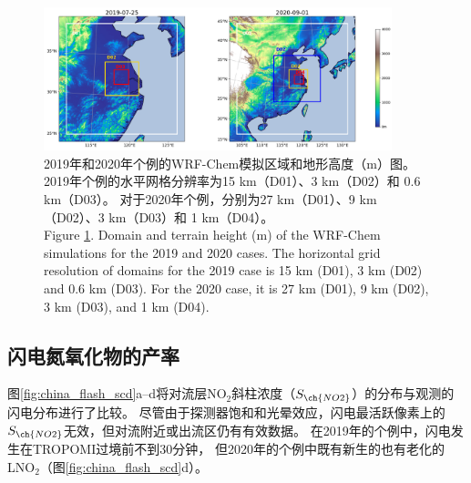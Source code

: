 \begin{figure}[!htbp]
\centering
\includegraphics[width=0.9\textwidth]{./figures/domains_china.png}
\caption{2019年和2020年个例的WRF-Chem模拟区域和地形高度（m）图。
2019年个例的水平网格分辨率为15 km（D01）、3 km（D02）和 0.6 km（D03）。
对于2020年个例，分别为27 km（D01）、9 km（D02）、3 km（D03）和 1 km（D04）。\\
Figure \ref{fig:domains_china}. Domain and terrain height (m) of the WRF-Chem simulations for the 2019 and 2020 cases. The horizontal grid resolution of
domains for the 2019 case is 15 km (D01), 3 km (D02) and 0.6 km (D03). For the 2020 case, it is 27 km (D01), 9 km (D02), 3 km (D03),
and 1 km (D04).}
\label{fig:domains_china}
\end{figure}

\subsection{闪电氮氧化物的产率}

图\ref{fig:china_flash_scd}a--d将对流层NO$_2$斜柱浓度（$S_{\ch{NO2}}$）的分布与观测的闪电分布进行了比较。
尽管由于探测器饱和和光晕效应，闪电最活跃像素上的$S_{\ch{NO2}}$无效，但对流附近或出流区仍有有效数据。
在2019年的个例中，闪电发生在TROPOMI过境前不到30分钟，
但2020年的个例中既有新生的也有老化的LNO$_2$（图\ref{fig:china_flash_scd}d）。

